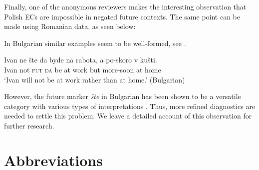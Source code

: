 \documentclass[output=paper,
]{langscibook}
\begin{document}
\noindent Finally, one of the anonymous reviewers makes the interesting observation that Polish ECs are impossible in negated future contexts. The same point can be made using Romanian data, as seen below:

	\z

\noindent In Bulgarian similar examples seem to be well-formed, see . 

\ea \gll Ivan ne šte da byde na rabota, a po-skoro v kušti.\\
    Ivan not \textsc{fut} \textsc{da} be at work but more-soon at home\\
    \glt `Ivan will not be at work rather than at home.'  \hfill (Bulgarian) \label{bulgfut}
    \z 
    

\noindent However, the future marker \textit{šte} in Bulgarian has been shown to be a versatile category with various types of interpretations \citep{rivsimeo14}. Thus, more refined diagnostics are needed to settle this problem. We leave a detailed account of this observation for further research. 



\nopagebreak
\section*{Abbreviations}
\end{document}
